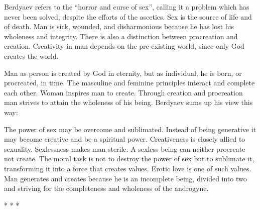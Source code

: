 Berdyaev refers to the ``horror and curse of sex'', calling it a problem which has never been solved, despite the efforts of the ascetics. Sex is the source of life and of death. Man is sick, wounded, and disharmonious because he has lost his wholeness and integrity. There is also a distinction between procreation and creation. Creativity in man depends on the pre-existing world, since only God creates the world.

Man as person is created by God in eternity, but as individual, he is born, or procreated, in time. The masculine and feminine principles interact and complete each other. Woman inspires man to create. Through creation and procreation man strives to attain the wholeness of his being. Berdyaev sums up his view this way:

\begin{quotex}
The power of sex may be overcome and sublimated. Instead of being generative it may become creative and be a spiritual power. Creativeness is closely allied to sexuality. Sexlessness makes man sterile. A sexless being can neither procreate not create. The moral task is not to destroy the power of sex but to sublimate it, transforming it into a force that creates values. Erotic love is one of such values. Man generates and creates because he is an incomplete being, divided into two and striving for the completeness and wholeness of the androgyne.
\end{quotex}




\begin{center}* * *\end{center}

